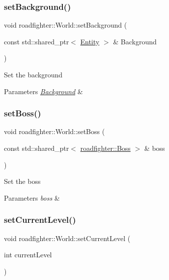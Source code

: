 \subsubsection{\texorpdfstring{set\+Background()}{setBackground()}}
{\footnotesize\ttfamily void roadfighter\+::\+World\+::set\+Background (\begin{DoxyParamCaption}\item[{const std\+::shared\+\_\+ptr$<$ \hyperlink{classroadfighter_1_1Entity}{Entity} $>$ \&}]{Background }\end{DoxyParamCaption})}

Set the background 
\begin{DoxyParams}{Parameters}
{\em \hyperlink{classroadfighter_1_1Background}{Background}} & \\
\hline
\end{DoxyParams}
\mbox{\label{classroadfighter_1_1World_a401b2f450e416827837d2f91da812381}} 
\subsubsection{\texorpdfstring{set\+Boss()}{setBoss()}}
{\footnotesize\ttfamily void roadfighter\+::\+World\+::set\+Boss (\begin{DoxyParamCaption}\item[{const std\+::shared\+\_\+ptr$<$ \hyperlink{classroadfighter_1_1Boss}{roadfighter\+::\+Boss} $>$ \&}]{boss }\end{DoxyParamCaption})}

Set the boss 
\begin{DoxyParams}{Parameters}
{\em boss} & \\
\hline
\end{DoxyParams}
\mbox{\label{classroadfighter_1_1World_adeace1fdc242cdaa44fb24e21e9b096b}} 
\subsubsection{\texorpdfstring{set\+Current\+Level()}{setCurrentLevel()}}
{\footnotesize\ttfamily void roadfighter\+::\+World\+::set\+Current\+Level (\begin{DoxyParamCaption}\item[{int}]{current\+Level }\end{DoxyParamCaption})}

